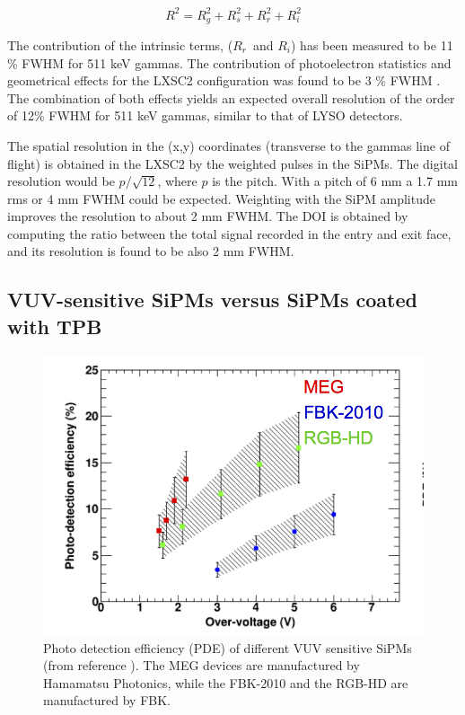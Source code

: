 \documentclass[11pt,a4paper]{article}
\begin{document}
\begin{equation}
R^2 = R_g^2 + R_s^2 + R_r^2 + R_i^2
\end{equation}

The contribution of the intrinsic terms, ($R_r$~and $R_i$) has been measured to be 11 \% FWHM \cite{aprileRes} for 511 keV gammas. The contribution of photoelectron statistics and geometrical effects for the LXSC2 configuration was found to be 3 \% FWHM \cite{Petalo2015}. The combination of both effects yields an expected 
overall resolution of the order of 12\% FWHM for 511 keV gammas, similar to that of LYSO detectors. 

The spatial resolution in the (x,y) coordinates (transverse to the gammas line of flight) is obtained in the LXSC2 by the weighted pulses in the SiPMs. The digital resolution would be
$p/\sqrt{12}$, where $p$ is the pitch. With a pitch of 6 mm a 1.7 mm rms or 4 mm FWHM could be expected. Weighting with the SiPM amplitude improves the resolution to about 2 mm FWHM. The DOI is obtained by computing the ratio between the
total signal recorded in the entry and exit face, and its resolution is found to be also 2 mm FWHM. 

\subsection*{VUV-sensitive SiPMs versus SiPMs coated with TPB}

\begin{figure}[!htbp]
	\centering
	\includegraphics[scale=0.8]{img/PDEVUV.png}
	\caption{Photo detection efficiency (PDE) of different VUV sensitive SiPMs
	(from reference \cite{vuv}). The MEG devices are
	manufactured by Hamamatsu Photonics, while the FBK-2010 and the RGB-HD
	are manufactured by FBK.  }\label{fig.vuv} 
\end{figure}
\end{document}
